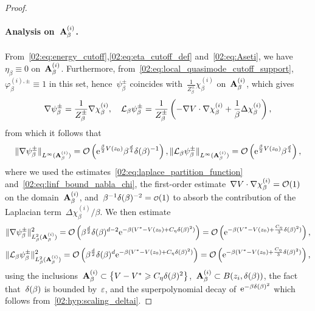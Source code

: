 \begin{proof}
            \paragraph{Analysis on~$\mathbf{A}_\beta^{(i)}$.\newline}
            From~\eqref{02:eq:energy_cutoff},\eqref{02:eq:eta_cutoff_def} and~\eqref{02:eq:Aseti}, we have~$\eta_\beta \equiv 0$ on~$\mathbf{A}_\beta^{(i)}$. Furthermore, from~\eqref{02:eq:local_quasimode_cutoff_support},~${\varphi_\beta^{(i),\pm} \equiv 1}$ in this set, hence~$\psi_\beta^\pm$ coincides with~$\frac1{Z_\beta^\pm}\chi_\beta^{(i)}$ on~$\mathbf{A}_\beta^{(i)}$,
            which gives
            \[\nabla \psi_\beta^\pm = \frac1{Z_\beta^\pm}\nabla \chi_\beta^{(i)},\quad \mathcal{L}_\beta \psi_\beta^\pm = \frac1{Z_\beta^\pm}\left(-\nabla V\cdot \nabla\chi_\beta^{(i)} + \frac1\beta \Delta \chi_\beta^{(i)}\right),\]
            from which it follows that
            \[\|\nabla\psi_\beta^\pm\|_{L^\infty(\mathbf{A}_\beta^{(i)})}=\mathcal{O}\left(\mathrm{e}^{\frac\beta2 V(z_0)}\beta^{\frac d4}\delta(\beta)^{-1}\right),\|\mathcal{L}_\beta \psi_\beta^\pm\|_{L^\infty(\mathbf{A}_\beta^{(i)})} = \mathcal{O}\left(\mathrm{e}^{\frac\beta2 V(z_0)}\beta^{\frac d4}\right),\]
            where we used the estimates~\eqref{02:eq:laplace_partition_function} and~\eqref{02:eq:linf_bound_nabla_chi}, the first-order estimate~$\nabla V\cdot\nabla \chi_\beta^{(i)}=\mathcal{O}(1)$ on the domain~$\mathbf{A}_\beta^{(i)}$, and~$\beta^{-1}\largeRadius(\beta)^{-2}=\smallo(1)$ to absorb the contribution of the Laplacian term~$\Delta \chi_\beta^{(i)}/\beta$.
            We then estimate
            \[\|\nabla\psi_\beta^\pm\|^2_{L_\beta^2(\mathbf{A}_\beta^{(i)})}=\mathcal{O}\left(\beta^{\frac d2}\delta(\beta)^{d-2}\mathrm{e}^{-\beta(V^*-V(z_0)+C_\eta\delta(\beta)^2)}\right)=\mathcal{O}\left(\mathrm{e}^{-\beta(V^*-V(z_0)+\frac{C_\eta}3\delta(\beta)^2)}\right),\]
            \[\|\mathcal{L}_\beta\psi_\beta^\pm\|^2_{L_\beta^2(\mathbf{A}_\beta^{(i)})} = \mathcal{O}\left(\beta^{\frac d2}\delta(\beta)^{d}\mathrm{e}^{-\beta(V^*-V(z_0)+C_\eta\delta(\beta)^2)}\right)=\mathcal{O}\left(\mathrm{e}^{-\beta(V^*-V(z_0)+\frac{C_\eta}3\delta(\beta)^2)}\right),\]
            using the inclusions~$\mathbf{A}_\beta^{(i)} \subset \left\{V-V^* \geqslant C_\eta \delta(\beta)^2\right\}$,~$\mathbf{A}_\beta^{(i)}\subset B(z_i,\delta(\beta))$, the fact that~$\delta(\beta)$ is bounded by~$\varepsilon$, and the superpolynomial decay of~$\mathrm{e}^{-\beta\delta(\beta)^2}$ which follows from~\eqref{02:hyp:scaling_deltai}.


\end{proof}
